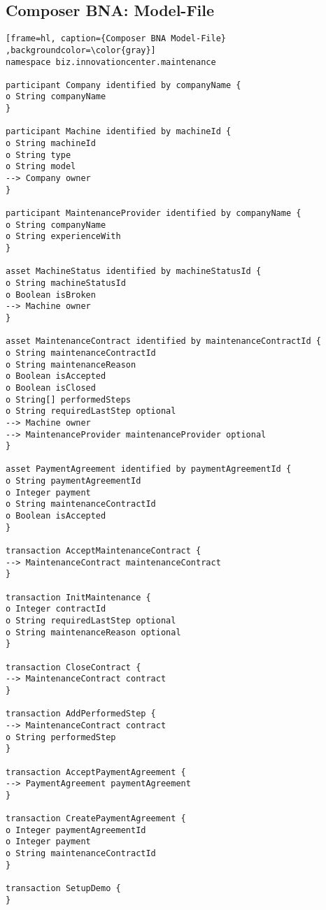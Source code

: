 
\begin{appendices}

\chapter{Composer BNA: Model-File}
\label{append:model-file}
    
\begin{lstlisting}[frame=hl, caption={Composer BNA Model-File} ,backgroundcolor=\color{gray}]
namespace biz.innovationcenter.maintenance

participant Company identified by companyName {
o String companyName  
}

participant Machine identified by machineId {
o String machineId
o String type
o String model
--> Company owner
}

participant MaintenanceProvider identified by companyName {
o String companyName
o String experienceWith
}

asset MachineStatus identified by machineStatusId {
o String machineStatusId
o Boolean isBroken
--> Machine owner
}

asset MaintenanceContract identified by maintenanceContractId {
o String maintenanceContractId
o String maintenanceReason
o Boolean isAccepted
o Boolean isClosed
o String[] performedSteps
o String requiredLastStep optional
--> Machine owner
--> MaintenanceProvider maintenanceProvider optional
}

asset PaymentAgreement identified by paymentAgreementId {
o String paymentAgreementId
o Integer payment
o String maintenanceContractId
o Boolean isAccepted
}

transaction AcceptMaintenanceContract {
--> MaintenanceContract maintenanceContract
}

transaction InitMaintenance {
o Integer contractId
o String requiredLastStep optional
o String maintenanceReason optional
}

transaction CloseContract {
--> MaintenanceContract contract
}

transaction AddPerformedStep {
--> MaintenanceContract contract
o String performedStep
}

transaction AcceptPaymentAgreement {
--> PaymentAgreement paymentAgreement
}

transaction CreatePaymentAgreement {
o Integer paymentAgreementId
o Integer payment
o String maintenanceContractId
}

transaction SetupDemo {
}


\end{lstlisting}
\end{appendices}
